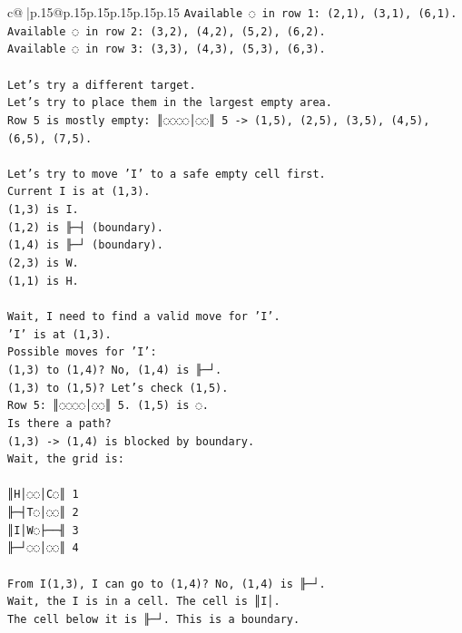 \documentclass{article}
\begin{document}
{\begin{supertabular}{c@{$\;$}|p{.15\linewidth}@{}p{.15\linewidth}p{.15\linewidth}p{.15\linewidth}p{.15\linewidth}p{.15\linewidth}}
{{{\texttt{Available ◌ in row 1: (2,1), (3,1), (6,1).} \\
\texttt{Available ◌ in row 2: (3,2), (4,2), (5,2), (6,2).} \\
\texttt{Available ◌ in row 3: (3,3), (4,3), (5,3), (6,3).} \\
\\ 
\texttt{Let's try a different target.} \\
\texttt{Let's try to place them in the largest empty area.} \\
\texttt{Row 5 is mostly empty: ║◌◌◌◌│◌◌║ 5 {-}> (1,5), (2,5), (3,5), (4,5), (6,5), (7,5).} \\
\\ 
\texttt{Let's try to move 'I' to a safe empty cell first.} \\
\texttt{Current I is at (1,3).} \\
\texttt{(1,3) is I.} \\
\texttt{(1,2) is ╟─┤ (boundary).} \\
\texttt{(1,4) is ╟─┘ (boundary).} \\
\texttt{(2,3) is W.} \\
\texttt{(1,1) is H.} \\
\\ 
\texttt{Wait, I need to find a valid move for 'I'.} \\
\texttt{'I' is at (1,3).} \\
\texttt{Possible moves for 'I':} \\
\texttt{(1,3) to (1,4)? No, (1,4) is ╟─┘.} \\
\texttt{(1,3) to (1,5)? Let's check (1,5).} \\
\texttt{Row 5: ║◌◌◌◌│◌◌║ 5. (1,5) is ◌.} \\
\texttt{Is there a path?} \\
\texttt{(1,3) {-}> (1,4) is blocked by boundary.} \\
\texttt{Wait, the grid is:} \\
\\ 
\texttt{║H│◌◌│C◌║ 1} \\
\texttt{╟─┤T◌│◌◌║ 2} \\
\texttt{║I│W◌├──╢ 3} \\
\texttt{╟─┘◌◌│◌◌║ 4} \\
\\ 
\texttt{From I(1,3), I can go to (1,4)? No, (1,4) is ╟─┘.} \\
\texttt{Wait, the I is in a cell. The cell is ║I│.} \\
\texttt{The cell below it is ╟─┘. This is a boundary.} \\
}}}
\end{supertabular}}
\end{document}
